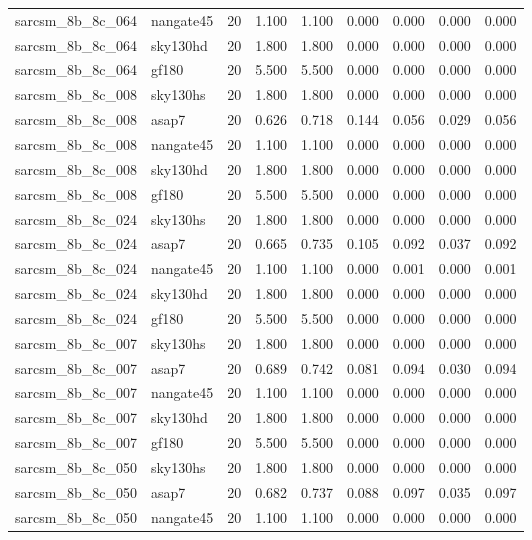 \begin{tabular}{llrrrrrrr}
sarcsm\_8b\_8c\_064 & nangate45 & 20 & 1.100 & 1.100 & 0.000 & 0.000 & 0.000 & 0.000 \\
sarcsm\_8b\_8c\_064 & sky130hd & 20 & 1.800 & 1.800 & 0.000 & 0.000 & 0.000 & 0.000 \\
sarcsm\_8b\_8c\_064 & gf180 & 20 & 5.500 & 5.500 & 0.000 & 0.000 & 0.000 & 0.000 \\
sarcsm\_8b\_8c\_008 & sky130hs & 20 & 1.800 & 1.800 & 0.000 & 0.000 & 0.000 & 0.000 \\
sarcsm\_8b\_8c\_008 & asap7 & 20 & 0.626 & 0.718 & 0.144 & 0.056 & 0.029 & 0.056 \\
sarcsm\_8b\_8c\_008 & nangate45 & 20 & 1.100 & 1.100 & 0.000 & 0.000 & 0.000 & 0.000 \\
sarcsm\_8b\_8c\_008 & sky130hd & 20 & 1.800 & 1.800 & 0.000 & 0.000 & 0.000 & 0.000 \\
sarcsm\_8b\_8c\_008 & gf180 & 20 & 5.500 & 5.500 & 0.000 & 0.000 & 0.000 & 0.000 \\
sarcsm\_8b\_8c\_024 & sky130hs & 20 & 1.800 & 1.800 & 0.000 & 0.000 & 0.000 & 0.000 \\
sarcsm\_8b\_8c\_024 & asap7 & 20 & 0.665 & 0.735 & 0.105 & 0.092 & 0.037 & 0.092 \\
sarcsm\_8b\_8c\_024 & nangate45 & 20 & 1.100 & 1.100 & 0.000 & 0.001 & 0.000 & 0.001 \\
sarcsm\_8b\_8c\_024 & sky130hd & 20 & 1.800 & 1.800 & 0.000 & 0.000 & 0.000 & 0.000 \\
sarcsm\_8b\_8c\_024 & gf180 & 20 & 5.500 & 5.500 & 0.000 & 0.000 & 0.000 & 0.000 \\
sarcsm\_8b\_8c\_007 & sky130hs & 20 & 1.800 & 1.800 & 0.000 & 0.000 & 0.000 & 0.000 \\
sarcsm\_8b\_8c\_007 & asap7 & 20 & 0.689 & 0.742 & 0.081 & 0.094 & 0.030 & 0.094 \\
sarcsm\_8b\_8c\_007 & nangate45 & 20 & 1.100 & 1.100 & 0.000 & 0.000 & 0.000 & 0.000 \\
sarcsm\_8b\_8c\_007 & sky130hd & 20 & 1.800 & 1.800 & 0.000 & 0.000 & 0.000 & 0.000 \\
sarcsm\_8b\_8c\_007 & gf180 & 20 & 5.500 & 5.500 & 0.000 & 0.000 & 0.000 & 0.000 \\
sarcsm\_8b\_8c\_050 & sky130hs & 20 & 1.800 & 1.800 & 0.000 & 0.000 & 0.000 & 0.000 \\
sarcsm\_8b\_8c\_050 & asap7 & 20 & 0.682 & 0.737 & 0.088 & 0.097 & 0.035 & 0.097 \\
sarcsm\_8b\_8c\_050 & nangate45 & 20 & 1.100 & 1.100 & 0.000 & 0.000 & 0.000 & 0.000 \\

\end{tabular}
